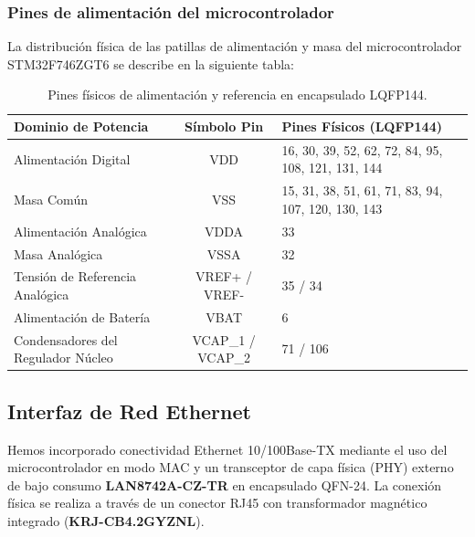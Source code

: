 \documentclass[12pt,a4paper]{article}
\begin{document}
\subsubsection{Pines de alimentación del microcontrolador}

La distribución física de las patillas de alimentación y masa del microcontrolador STM32F746ZGT6 se describe en la siguiente tabla:

\begin{table}[H]
\centering
\small
\begin{tabularx}{\textwidth}{|l|c|X|}
\hline
\textbf{Dominio de Potencia} & \textbf{Símbolo Pin} & \textbf{Pines Físicos (LQFP144)} \\ \hline
Alimentación Digital & VDD & 16, 30, 39, 52, 62, 72, 84, 95, 108, 121, 131, 144 \\ \hline
Masa Común & VSS & 15, 31, 38, 51, 61, 71, 83, 94, 107, 120, 130, 143 \\ \hline
Alimentación Analógica & VDDA & 33 \\ \hline
Masa Analógica & VSSA & 32 \\ \hline
Tensión de Referencia Analógica & VREF+ / VREF- & 35 / 34 \\ \hline
Alimentación de Batería & VBAT & 6 \\ \hline
Condensadores del Regulador Núcleo & VCAP\_1 / VCAP\_2 & 71 / 106 \\ \hline
\end{tabularx}
\caption{Pines físicos de alimentación y referencia en encapsulado LQFP144.}
\label{tab:alimentacion_pines}
\end{table}

\subsection{Interfaz de Red Ethernet}

Hemos incorporado conectividad Ethernet 10/100Base-TX mediante el uso del microcontrolador en modo MAC y un transceptor de capa física (PHY) externo de bajo consumo \textbf{LAN8742A-CZ-TR} en encapsulado QFN-24. La conexión física se realiza a través de un conector RJ45 con transformador magnético integrado (\textbf{KRJ-CB4.2GYZNL}).
\end{document}

